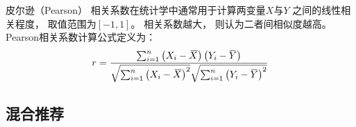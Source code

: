 皮尔逊（Pearson）
相关系数在统计学中通常用于计算两变量$X$与$Y$
之间的线性相关程度，
取值范围为$\left[-1,1\right]$。
相关系数越大，
则认为二者间相似度越高。
Pearson相关系数计算公式定义为：
\begin{equation}
    r=\frac{\sum_{i=1}^n\left(X_i-\overbari{X}\right)\left(Y_i-\overbar{Y}\right)}{\sqrt{\sum_{i=1}^n\left(X_i-\overbari{X}\right)^2}\sqrt{\sum_{i=1}^n\left(Y_i-\overbar{Y}\right)^2}}
\end{equation}

\subsection{混合推荐}
